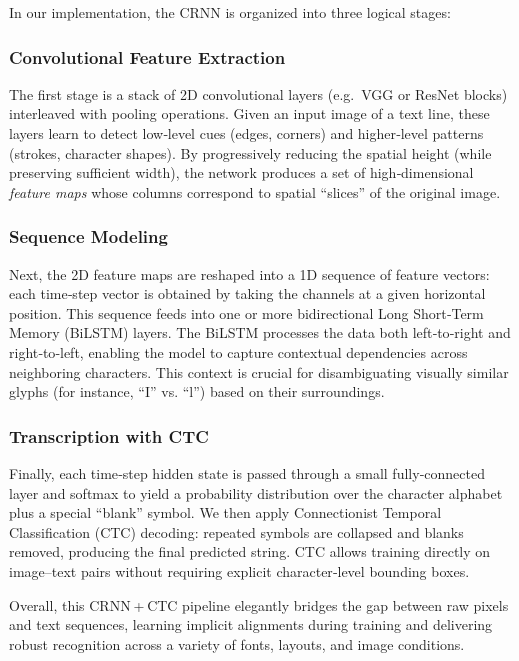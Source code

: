 In our implementation, the CRNN is organized into three logical stages:

\subsubsection*{Convolutional Feature Extraction}
The first stage is a stack of 2D convolutional layers (e.g.\ VGG or ResNet blocks) interleaved with pooling operations. Given an input image of a text line, these layers learn to detect low‑level cues (edges, corners) and higher‑level patterns (strokes, character shapes). By progressively reducing the spatial height (while preserving sufficient width), the network produces a set of high‑dimensional \emph{feature maps} whose columns correspond to spatial “slices” of the original image.

\subsubsection*{Sequence Modeling}
Next, the 2D feature maps are reshaped into a 1D sequence of feature vectors: each time‑step vector is obtained by taking the channels at a given horizontal position. This sequence feeds into one or more bidirectional Long Short‑Term Memory (BiLSTM) layers. The BiLSTM processes the data both left‑to‑right and right‑to‑left, enabling the model to capture contextual dependencies across neighboring characters. This context is crucial for disambiguating visually similar glyphs (for instance, “I” vs. “l”) based on their surroundings.

\subsubsection*{Transcription with CTC}
Finally, each time‑step hidden state is passed through a small fully‑connected layer and softmax to yield a probability distribution over the character alphabet plus a special “blank” symbol. We then apply Connectionist Temporal Classification (CTC) decoding: repeated symbols are collapsed and blanks removed, producing the final predicted string. CTC allows training directly on image–text pairs without requiring explicit character‐level bounding boxes.

Overall, this CRNN + CTC pipeline elegantly bridges the gap between raw pixels and text sequences, learning implicit alignments during training and delivering robust recognition across a variety of fonts, layouts, and image conditions.

